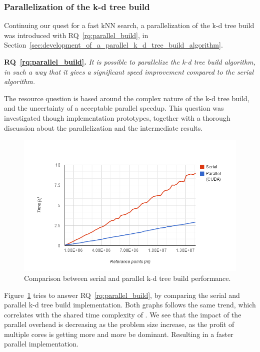 \subsubsection{Parallelization of the k-d tree build} %
\label{ssub:parallelization_of_the_k_d_tree_build}

Continuing our quest for a fast kNN search, a parallelization of the k-d tree build was introduced with RQ~\ref{rq:parallel_build}, in Section~\ref{sec:development_of_a_parallel_k_d_tree_build_algorithm}.

\textbf{RQ~\ref{rq:parallel_build}.} \emph{It is possible to parallelize the k-d tree build algorithm, in such a way that it gives a significant speed improvement compared to the serial algorithm.}

The resource question is based around the complex nature of the k-d tree build, and the uncertainty of a acceptable parallel speedup. This question was investigated though implementation prototypes, together with a thorough discussion about the parallelization and the intermediate results. 

\begin{figure}[ht!]
    \centering
    \includegraphics[width=120mm]{../gfx/final_tree_build.png}
    \caption{Comparison between serial and parallel k-d tree build performance.}
    \label{fig:final_tree_build}
\end{figure}

Figure~\ref{fig:final_tree_build} tries to answer RQ~\ref{rq:parallel_build}, by comparing the serial and parallel k-d tree build implementation. Both graphs follows the same trend, which correlates with the shared time complexity of . We see that the impact of the parallel overhead is decreasing as the problem size increase, as the profit of multiple cores is getting more and more be dominant. Resulting in a faster parallel implementation.

